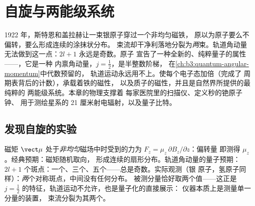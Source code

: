 \chapter{自旋与两能级系统}\label{ch:b3:spin-two-level}

1922 年，斯特恩和盖拉赫让一束银原子穿过一个非均匀磁铁，
原以为原子要么不偏转，要么形成连续的涂抹状分布。
束流却干净利落地分裂为\emph{两}束。轨道角动量
无法做到这一点：$2l + 1$ 永远是奇数。原子
宣告了一种全新的、纯粹量子的属性——\emph{}，它是一种
内禀角动量，$j = \tfrac12$，是半整数阶梯，
在\cref{ch:b3:quantum-angular-momentum}中代数预留的，
轨道运动永远用不上。使每个电子态加倍（完成了
周期表背后的计数），承载着铁的磁性，
以及质子的磁性，并且是自然界所提供的最纯粹的
两能级系统。本章的物理支撑着
每家医院里的扫描仪、定义秒的铯原子钟、
用于测绘星系的 21 厘米射电辐射，以及量子比特。

\section{发现自旋的实验}

\begin{example}\label{ex:b3:spin-two-level:stern-gerlach}
磁矩 $\vect\mu$ 处于\emph{非均匀}磁场中时受到的力为
$F_z = \mu_z\,\partial B_z/\partial z$：偏转量
即测得 $\mu_z$。经典预期：磁矩随机取向，
形成连续的扇形分布。轨道角动量的量子预期：$2l + 1$
个斑点：一个、三个、五个——总是奇数。实际观测（银
原子，氢原子同样）：\emph{两}个对称斑点，中间没有任何分布。
被测分量恰好取两个值——这正是 $j
= \tfrac12$ 的特征，轨道运动不允许，也是量子化的直接展示：
仪器本质上是测量单一分量的装置，
束流分裂为其两个。
\end{example}


